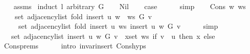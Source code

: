 \begin{isabellebody}
%
\isadelimproof
\ \ %
\endisadelimproof
%
\isatagproof
{}\isamarkupfalse%
\ assms\isanewline
{}\isamarkupfalse%
\ {\isacharparenleft}{\kern0pt}induct\ l\ arbitrary{\isacharcolon}{\kern0pt}\ G{\isacharparenright}{\kern0pt}\isanewline
\ \ \isamarkupfalse%
\ Nil\isanewline
\ \ \isamarkupfalse%
\ {\isacharquery}{\kern0pt}case\isanewline
\ \ \ \ \isamarkupfalse%
\ simp\isanewline
{}\isamarkupfalse%
\isanewline
\ \ \isamarkupfalse%
\ {\isacharparenleft}{\kern0pt}Cons\ w\ ws{\isacharparenright}{\kern0pt}\isanewline
\ \ \isamarkupfalse%
\isanewline
\ \ \ \ {\isachardoublequoteopen}set\ {\isacharparenleft}{\kern0pt}adjacency{\isacharunderscore}{\kern0pt}list\ {\isacharparenleft}{\kern0pt}fold\ {\isacharparenleft}{\kern0pt}insert{\isacharprime}{\kern0pt}\ u{\isacharparenright}{\kern0pt}\ {\isacharparenleft}{\kern0pt}w\ {\isacharhash}{\kern0pt}\ ws{\isacharparenright}{\kern0pt}\ G{\isacharparenright}{\kern0pt}\ v{\isacharparenright}{\kern0pt}\ {\isacharequal}{\kern0pt}\isanewline
\ \ \ \ \ set\ {\isacharparenleft}{\kern0pt}adjacency{\isacharunderscore}{\kern0pt}list\ {\isacharparenleft}{\kern0pt}fold\ {\isacharparenleft}{\kern0pt}insert{\isacharprime}{\kern0pt}\ u{\isacharparenright}{\kern0pt}\ ws\ {\isacharparenleft}{\kern0pt}insert{\isacharprime}{\kern0pt}\ u\ w\ G{\isacharparenright}{\kern0pt}{\isacharparenright}{\kern0pt}\ v{\isacharparenright}{\kern0pt}{\isachardoublequoteclose}\isanewline
\ \ \ \ \isamarkupfalse%
\ simp\isanewline
\ \ \isamarkupfalse%
\ \isamarkupfalse%
\ {\isachardoublequoteopen}{\isachardot}{\kern0pt}{\isachardot}{\kern0pt}{\isachardot}{\kern0pt}\ {\isacharequal}{\kern0pt}\ set\ {\isacharparenleft}{\kern0pt}adjacency{\isacharunderscore}{\kern0pt}list\ {\isacharparenleft}{\kern0pt}insert{\isacharprime}{\kern0pt}\ u\ w\ G{\isacharparenright}{\kern0pt}\ v{\isacharparenright}{\kern0pt}\ {\isasymunion}\ {\isacharparenleft}{\kern0pt}{\isasymUnion}x{\isasymin}set\ ws{\isachardot}{\kern0pt}\ if\ v\ {\isacharequal}{\kern0pt}\ u\ then\ {\isacharbraceleft}{\kern0pt}x{\isacharbraceright}{\kern0pt}\ else\ {\isacharbraceleft}{\kern0pt}{\isacharbraceright}{\kern0pt}{\isacharparenright}{\kern0pt}{\isachardoublequoteclose}\isanewline
\ \ \ \ \isamarkupfalse%
\ Cons{\isachardot}{\kern0pt}prems\isanewline
\ \ \ \ \isamarkupfalse%
\ {\isacharparenleft}{\kern0pt}intro\ invar{\isacharunderscore}{\kern0pt}insert{\isacharprime}{\kern0pt}\ Cons{\isachardot}{\kern0pt}hyps{\isacharparenright}{\kern0pt}\isanewline

\end{isabellebody}
